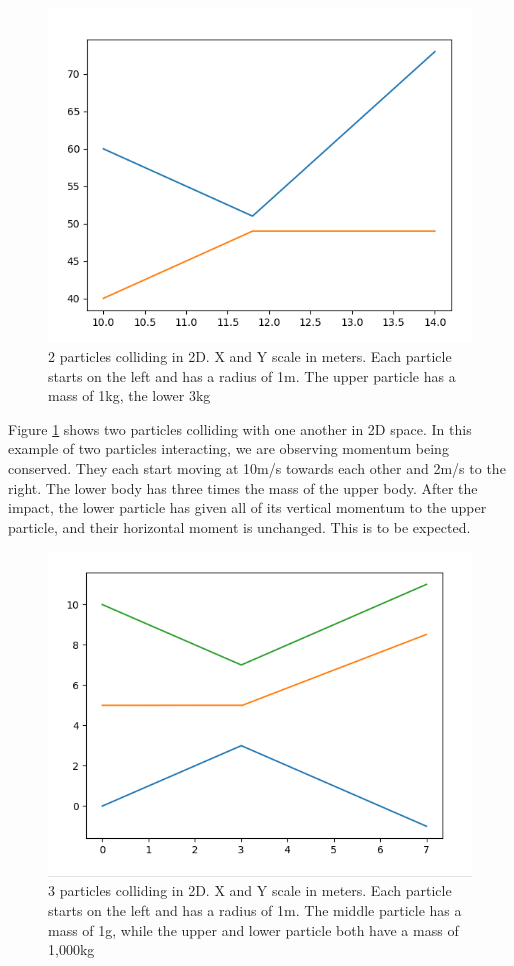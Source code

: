 \documentclass[conference]{IEEEtran}
\begin{document}
\begin{figure}[htbp]
	\centerline{\includegraphics[width=0.7\columnwidth]{./figs/2p.png}}
	\caption{2 particles colliding in 2D. X and Y scale in meters. Each particle starts on the left and has a radius of 1m. The upper particle has a mass of 1kg, the lower 3kg}
	\label{2p}
\end{figure}

Figure \ref{2p} shows two particles colliding with one another in 2D space. In this example of two particles interacting, we are observing momentum being conserved. They each start moving at 10m/s towards each other and 2m/s to the right. The lower body has three times the mass of the upper body. After the impact, the lower particle has given all of its vertical momentum to the upper particle, and their horizontal moment is unchanged. This is to be expected.

\begin{figure}[htbp]
	\centerline{\includegraphics[width=0.7\columnwidth]{./figs/3p.png}}
	\caption{3 particles colliding in 2D. X and Y scale in meters. Each particle starts on the left and has a radius of 1m. The middle particle has a mass of 1g, while the upper and lower particle both have a mass of 1,000kg}
	\label{3p}
\end{figure}
\end{document}
